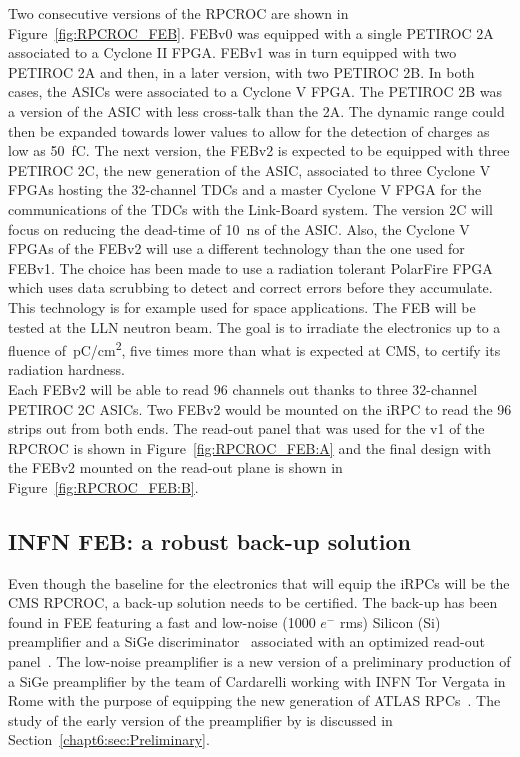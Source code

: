	Two consecutive versions of the RPCROC are shown in Figure~\ref{fig:RPCROC_FEB}. FEBv0 was equipped with a single PETIROC 2A associated to a Cyclone II FPGA. FEBv1 was in turn equipped with two PETIROC 2A and then, in a later version, with two PETIROC 2B. In both cases, the ASICs were associated to a Cyclone V FPGA. The PETIROC 2B was a version of the ASIC with less cross-talk than the 2A. The dynamic range could then be expanded towards lower values to allow for the detection of charges as low as \SI{50}{fC}. The next version, the FEBv2 is expected to be equipped with three PETIROC 2C, the new generation of the ASIC, associated to three Cyclone V FPGAs hosting the 32-channel TDCs and a master Cyclone V FPGA for the communications of the TDCs with the Link-Board system. The version 2C will focus on reducing the dead-time of \SI{10}{ns} of the ASIC. Also, the Cyclone V FPGAs of the FEBv2 will use a different technology than the one used for FEBv1. The choice has been made to use a radiation tolerant PolarFire FPGA which uses data scrubbing to detect and correct errors before they accumulate. This technology is for example used for space applications. The FEB will be tested at the \acf{LLN} neutron beam. The goal is to irradiate the electronics up to a fluence of \,\si{pC/cm^2}, five times more than what is expected at CMS, to certify its radiation hardness.\\
	Each FEBv2 will be able to read 96 channels out thanks to three 32-channel PETIROC 2C ASICs. Two FEBv2 would be mounted on the iRPC to read the 96 strips out from both ends. The read-out panel that was used for the v1 of the RPCROC is shown in Figure~\ref{fig:RPCROC_FEB:A} and the final design with the FEBv2 mounted on the read-out plane is shown in Figure~\ref{fig:RPCROC_FEB:B}.

	\subsection{INFN FEB: a robust back-up solution}
	\label{chapt6:ssec:INFN}
	
	Even though the baseline for the electronics that will equip the iRPCs will be the CMS RPCROC, a back-up solution needs to be certified. The back-up has been found in \acl{FEE} featuring a fast and low-noise (1000 $e^-$ rms) Silicon (Si) preamplifier and a SiGe discriminator~\cite{PIZZIMENTO2018} associated with an optimized read-out panel~\cite{ALUNNOCAMELIA2018}. The low-noise preamplifier is a new version of a preliminary production of a SiGe preamplifier by the team of Cardarelli working with INFN Tor Vergata in Rome with the purpose of equipping the new generation of ATLAS RPCs~\cite{CARDARELLI2013}. The study of the early version of the preamplifier by is discussed in Section~\ref{chapt6:sec:Preliminary}.
	 
